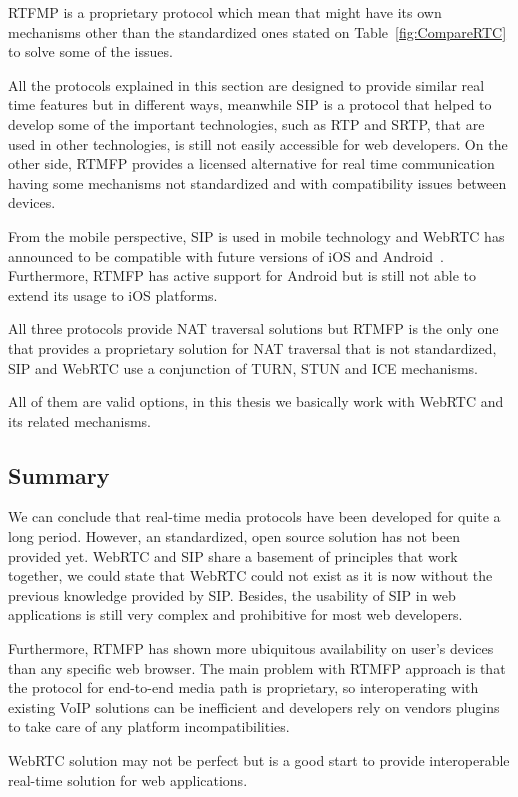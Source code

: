 RTFMP is a proprietary protocol which mean that might have its own mechanisms other than the standardized ones stated on Table~\ref{fig:CompareRTC} to solve some of the issues.

All the protocols explained in this section are designed to provide similar real time features but in different ways, meanwhile SIP is a protocol that helped to develop some of the important technologies, such as RTP and SRTP, that are used in other technologies, is still not easily accessible for web developers. On the other side, RTMFP provides a licensed alternative for real time communication having some mechanisms not standardized and with compatibility issues between devices.

From the mobile perspective, SIP is used in mobile technology and WebRTC has announced to be compatible with future versions of iOS and Android~\cite{ericssonbowser}. Furthermore, RTMFP has active support for Android but is still not able to extend its usage to iOS platforms.

All three protocols provide NAT traversal solutions but RTMFP is the only one that provides a proprietary solution for NAT traversal that is not standardized, SIP and WebRTC use a conjunction of TURN, STUN and ICE mechanisms.
	
All of them are valid options, in this thesis we basically work with WebRTC and its related mechanisms.	

\subsection{Summary}

We can conclude that real-time media protocols have been developed for quite a long period. However, an standardized, open source solution has not been provided yet.  WebRTC and SIP share a basement of principles that work together, we could state that WebRTC could not exist as it is now without the previous knowledge provided by SIP. Besides, the usability of SIP in web applications is still very complex and prohibitive for most web developers.

Furthermore, RTMFP has shown more ubiquitous availability on user's devices than any specific web browser. The main problem with RTMFP approach is that the protocol for end-to-end media path is proprietary, so interoperating with existing VoIP solutions can be inefficient and developers rely on vendors plugins to take care of any platform incompatibilities.

WebRTC solution may not be perfect but is a good start to provide interoperable real-time solution for web applications.